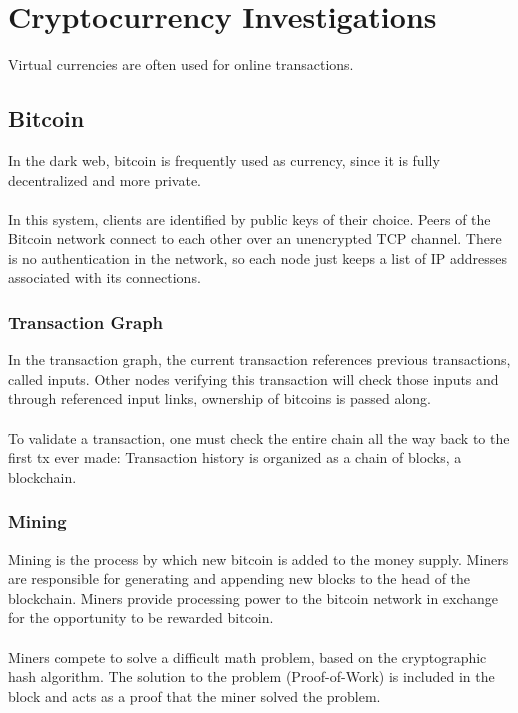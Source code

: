 \documentclass[10pt,a4paper]{report}
\begin{document}
\section{Cryptocurrency Investigations}
Virtual currencies are often used for online transactions.
\subsection{Bitcoin}
In the dark web, bitcoin is frequently used as currency, since it is fully decentralized and more private.\\
\\
In this system, clients are identified by public keys of their choice. Peers of the Bitcoin network connect to each other over an unencrypted TCP channel. There is no authentication in the network, so each node just keeps a list of IP addresses associated with its connections.
\subsubsection{Transaction Graph}
In the transaction graph, the current transaction references previous transactions, called inputs. Other nodes verifying this transaction will check those inputs and through referenced input links, ownership of bitcoins is passed along.\\
\\
To validate a transaction, one must check the entire chain all the way back to the first tx ever made: Transaction history is organized as a chain of blocks, a blockchain.
\subsubsection{Mining}
Mining is the process by which new bitcoin is added to the money supply. Miners are responsible for generating and appending new blocks to the head of the blockchain. Miners provide processing power to the bitcoin network in exchange for the opportunity to be rewarded bitcoin.\\
\\
Miners compete to solve a difficult math problem, based on the cryptographic hash algorithm. The solution to the problem (Proof-of-Work) is included in the block and acts as a proof that the miner solved the problem.
\end{document}
